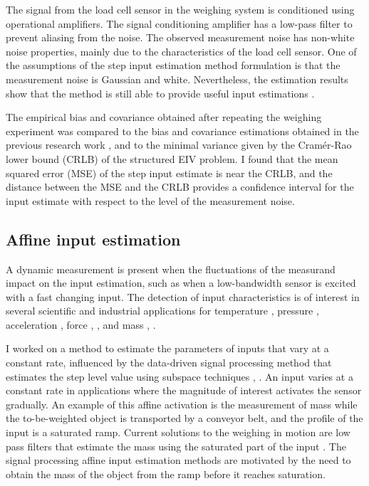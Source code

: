 The signal from the load cell sensor in the weighing system is conditioned using operational amplifiers.
The signal conditioning amplifier has a low-pass filter to prevent aliasing from the noise.
The observed measurement noise has non-white noise properties, mainly due to the characteristics of the load cell sensor.
One of the assumptions of the step input estimation method formulation is that the measurement noise is Gaussian and white. 
Nevertheless, the estimation results show that the method is still able to provide useful input estimations \citep{QuintanaTIM}.

The empirical bias and covariance obtained after repeating the weighing experiment was compared to the bias and covariance estimations obtained in the previous research work \citep{QuintanaCSDA}, and to the minimal variance given by the  Cram\'er-Rao lower bound (CRLB) of the structured EIV problem.
I found that the mean squared error (MSE) of the step input estimate is near the CRLB, and the distance between the MSE and the CRLB provides a confidence interval for the input estimate with respect to the level of the measurement noise. 

 
\subsection{Affine input estimation}

A dynamic measurement is present when the fluctuations of the measurand impact on the input estimation, such as when a low-bandwidth sensor is excited with a fast changing input.
The detection of input characteristics is of interest in several scientific and industrial applications for temperature \citep{Saggin01}, pressure \citep{Matthews14}, acceleration \citep{Link07}, force \citep{Vlajic16}, \citep{Hessling08a}, and mass \citep{Shu93}, \citep{Boschetti13}.

I worked on a method to estimate the parameters of inputs that vary at a constant rate, influenced by the data-driven signal processing method that estimates the step level value using subspace techniques \citep{Markovsky15cep}, \citep{Markovsky15ieee}.
An input varies at a constant rate in applications where the magnitude of interest activates the sensor gradually. 
An example of this affine activation is the measurement of mass while the to-be-weighted object is transported by a conveyor belt, and the profile of the input is a saturated ramp.
Current solutions to the weighing in motion are low pass filters that estimate the mass using the saturated part of the input \citep{Tasaki07, Pietrzak14}.
The signal processing affine input estimation methods are motivated by the need to obtain the mass of the object from the ramp before it reaches saturation.

